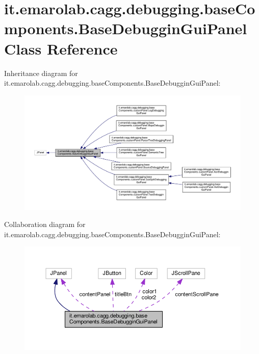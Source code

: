 \hypertarget{classit_1_1emarolab_1_1cagg_1_1debugging_1_1baseComponents_1_1BaseDebugginGuiPanel}{\section{it.\-emarolab.\-cagg.\-debugging.\-base\-Components.\-Base\-Debuggin\-Gui\-Panel Class Reference}
\label{classit_1_1emarolab_1_1cagg_1_1debugging_1_1baseComponents_1_1BaseDebugginGuiPanel}
}


Inheritance diagram for it.\-emarolab.\-cagg.\-debugging.\-base\-Components.\-Base\-Debuggin\-Gui\-Panel\-:\nopagebreak
\begin{figure}[H]
\begin{center}
\leavevmode
\includegraphics[width=350pt]{classit_1_1emarolab_1_1cagg_1_1debugging_1_1baseComponents_1_1BaseDebugginGuiPanel__inherit__graph}
\end{center}
\end{figure}


Collaboration diagram for it.\-emarolab.\-cagg.\-debugging.\-base\-Components.\-Base\-Debuggin\-Gui\-Panel\-:\nopagebreak
\begin{figure}[H]
\begin{center}
\leavevmode
\includegraphics[width=350pt]{classit_1_1emarolab_1_1cagg_1_1debugging_1_1baseComponents_1_1BaseDebugginGuiPanel__coll__graph}
\end{center}
\end{figure}
